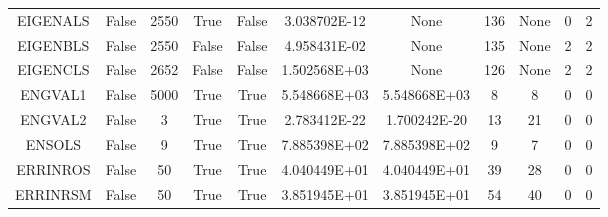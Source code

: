 \begin{longtable}{ccccccccccc}
	\cellcolor{default1} EIGENALS& \cellcolor{default1} False& \cellcolor{default1} 2550& \cellcolor{default1} True& \cellcolor{default1} False& \cellcolor{best} 3.038702E-12& \cellcolor{err} None& \cellcolor{best} 136& \cellcolor{err} None& \cellcolor{default1} 0& \cellcolor{default1} 2\\
	\cellcolor{default2} EIGENBLS& \cellcolor{default2} False& \cellcolor{default2} 2550& \cellcolor{default2} False& \cellcolor{default2} False& \cellcolor{best} 4.958431E-02& \cellcolor{err} None& \cellcolor{best} 135& \cellcolor{err} None& \cellcolor{default2} 2& \cellcolor{default2} 2\\
	\cellcolor{default1} EIGENCLS& \cellcolor{default1} False& \cellcolor{default1} 2652& \cellcolor{default1} False& \cellcolor{default1} False& \cellcolor{best} 1.502568E+03& \cellcolor{err} None& \cellcolor{best} 126& \cellcolor{err} None& \cellcolor{default1} 2& \cellcolor{default1} 2\\
	\cellcolor{default2} ENGVAL1& \cellcolor{default2} False& \cellcolor{default2} 5000& \cellcolor{default2} True& \cellcolor{default2} True& \cellcolor{ok} 5.548668E+03& \cellcolor{best} 5.548668E+03& \cellcolor{best} 8& \cellcolor{best} 8& \cellcolor{default2} 0& \cellcolor{default2} 0\\
	\cellcolor{default1} ENGVAL2& \cellcolor{default1} False& \cellcolor{default1} 3& \cellcolor{default1} True& \cellcolor{default1} True& \cellcolor{best} 2.783412E-22& \cellcolor{ok} 1.700242E-20& \cellcolor{best} 13& \cellcolor{ok} 21& \cellcolor{default1} 0& \cellcolor{default1} 0\\
	\cellcolor{default2} ENSOLS& \cellcolor{default2} False& \cellcolor{default2} 9& \cellcolor{default2} True& \cellcolor{default2} True& \cellcolor{best} 7.885398E+02& \cellcolor{ok} 7.885398E+02& \cellcolor{ok} 9& \cellcolor{best} 7& \cellcolor{default2} 0& \cellcolor{default2} 0\\
	\cellcolor{default1} ERRINROS& \cellcolor{default1} False& \cellcolor{default1} 50& \cellcolor{default1} True& \cellcolor{default1} True& \cellcolor{ok} 4.040449E+01& \cellcolor{best} 4.040449E+01& \cellcolor{ok} 39& \cellcolor{best} 28& \cellcolor{default1} 0& \cellcolor{default1} 0\\
	\cellcolor{default2} ERRINRSM& \cellcolor{default2} False& \cellcolor{default2} 50& \cellcolor{default2} True& \cellcolor{default2} True& \cellcolor{best} 3.851945E+01& \cellcolor{ok} 3.851945E+01& \cellcolor{ok} 54& \cellcolor{best} 40& \cellcolor{default2} 0& \cellcolor{default2} 0\\

\end{longtable}

